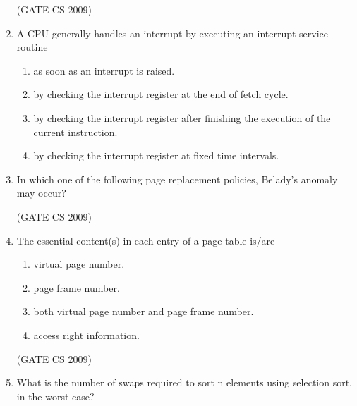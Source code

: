 \documentclass[a4paper, 11pt]{article}
\begin{document}
\begin{enumerate}
    \hfill (GATE CS 2009)

    \item A CPU generally handles an interrupt by executing an interrupt service routine
    \begin{enumerate}
        \item as soon as an interrupt is raised.
        \item by checking the interrupt register at the end of fetch cycle.
        \item by checking the interrupt register after finishing the execution of the current instruction.
        \item by checking the interrupt register at fixed time intervals.
    \end{enumerate}

    \item In which one of the following page replacement policies, Belady's anomaly may occur?
    \begin{enumerate}
    \end{enumerate}

    \hfill (GATE CS 2009)

    \item The essential content(s) in each entry of a page table is/are
    \begin{enumerate} 
        \item virtual page number.
        \item page frame number.
        \item both virtual page number and page frame number.
        \item access right information.
    \end{enumerate}

    \hfill (GATE CS 2009)

    \item What is the number of swaps required to sort n elements using selection sort, in the worst case?
    \begin{enumerate}
    \end{enumerate}


\end{enumerate}
\end{document}

